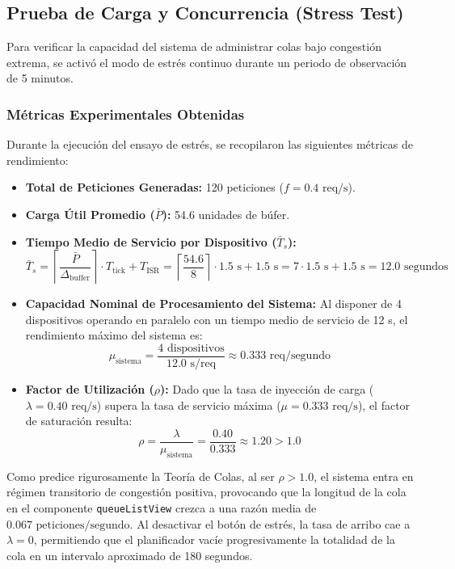 \documentclass[11pt,letterpaper]{article}
\begin{document}
\subsection{Prueba de Carga y Concurrencia (Stress Test)}
Para verificar la capacidad del sistema de administrar colas bajo congestión extrema, se activó el modo de estrés continuo durante un periodo de observación de 5 minutos. 

\subsubsection{Métricas Experimentales Obtenidas}
Durante la ejecución del ensayo de estrés, se recopilaron las siguientes métricas de rendimiento:
\begin{itemize}
    \item \textbf{Total de Peticiones Generadas:} 120 peticiones ($f = 0.4\text{ req/s}$).
    \item \textbf{Carga Útil Promedio ($\bar{P}$):} 54.6 unidades de búfer.
    \item \textbf{Tiempo Medio de Servicio por Dispositivo ($\bar{T}_s$):}
    \begin{equation}
        \bar{T}_s = \left\lceil \frac{\bar{P}}{\Delta_{\text{buffer}}} \right\rceil \cdot T_{\text{tick}} + T_{\text{ISR}} = \left\lceil \frac{54.6}{8} \right\rceil \cdot 1.5\text{ s} + 1.5\text{ s} = 7 \cdot 1.5\text{ s} + 1.5\text{ s} = 12.0\text{ segundos}
    \end{equation}
    \item \textbf{Capacidad Nominal de Procesamiento del Sistema:} Al disponer de 4 dispositivos operando en paralelo con un tiempo medio de servicio de 12 s, el rendimiento máximo del sistema es:
    \begin{equation}
        \mu_{\text{sistema}} = \frac{4\text{ dispositivos}}{12.0\text{ s/req}} \approx 0.333\text{ req/segundo}
    \end{equation}
    \item \textbf{Factor de Utilización ($\rho$):} Dado que la tasa de inyección de carga ($\lambda = 0.40\text{ req/s}$) supera la tasa de servicio máxima ($\mu = 0.333\text{ req/s}$), el factor de saturación resulta:
    \begin{equation}
        \rho = \frac{\lambda}{\mu_{\text{sistema}}} = \frac{0.40}{0.333} \approx 1.20 > 1.0
    \end{equation}
\end{itemize}
Como predice rigurosamente la Teoría de Colas, al ser $\rho > 1.0$, el sistema entra en régimen transitorio de congestión positiva, provocando que la longitud de la cola en el componente \texttt{queueListView} crezca a una razón media de $0.067\text{ peticiones/segundo}$. Al desactivar el botón de estrés, la tasa de arribo cae a $\lambda = 0$, permitiendo que el planificador vacíe progresivamente la totalidad de la cola en un intervalo aproximado de 180 segundos.
\end{document}
